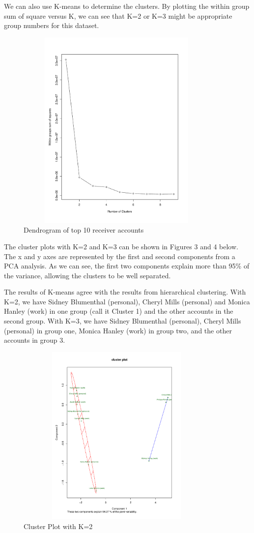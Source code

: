 We can also use K-means to determine the clusters. By plotting the within group sum of square versus K, we can see that K=2 or K=3 might be appropriate group numbers for this dataset.
\begin{figure}[h!]
    \centering
    \includegraphics[width=10cm,height=10cm]
    {daitong_and_yihe/clusterd.pdf}
    \caption{Dendrogram of top 10 receiver accounts}
\end{figure}

The cluster plots with K=2 and K=3 can be shown in Figures 3 and 4 below. The x and y axes are represented by the first and second components from a PCA analysis. As we can see, the first two components explain more than 95\% of the variance, allowing the clusters to be well separated. 

The results of K-means agree with the results from hierarchical clustering. With K=2, we have Sidney Blumenthal (personal), Cheryl Mills (personal) and Monica Hanley (work) in one group (call it Cluster 1) and the other accounts in the second group. With K=3, we have Sidney Blumenthal (personal), Cheryl Mills (personal) in group one, Monica Hanley (work) in group two, and the other accounts in group 3.

\begin{figure}[h!]
    \centering
    \includegraphics[width=10cm,height=9cm]
    {daitong_and_yihe/c2.pdf}
    \caption{Cluster Plot with K=2}
\end{figure}

